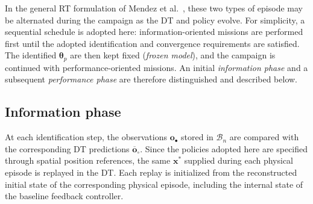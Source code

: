\documentclass[journal]{IEEEtran}
\begin{document}
In the general RT formulation of Mendez et al.~\cite{Mendez2026}, these two types of episode may be alternated during the campaign as the DT and policy evolve. For simplicity, a sequential schedule is adopted here: information-oriented missions are performed first until the adopted identification and convergence requirements are satisfied. The identified $\boldsymbol{\theta}_p$ are then kept fixed (\textit{frozen model}), and the campaign is continued with performance-oriented missions. An initial \emph{information phase} and a subsequent \emph{performance phase} are therefore distinguished and described below.

\subsection{Information phase} 
At each identification step, the observations $\mathbf o_\bullet$ stored in $\mathcal B_n$ are compared with the corresponding DT predictions $\overline{\mathbf o}_\circ$. Since the policies adopted here are specified through spatial position references, the same $\mathbf x^\ast$ supplied during each physical episode is replayed in the DT. Each replay is initialized from the reconstructed initial state of the corresponding physical episode, including the internal state of the baseline feedback controller. 
\end{document}
